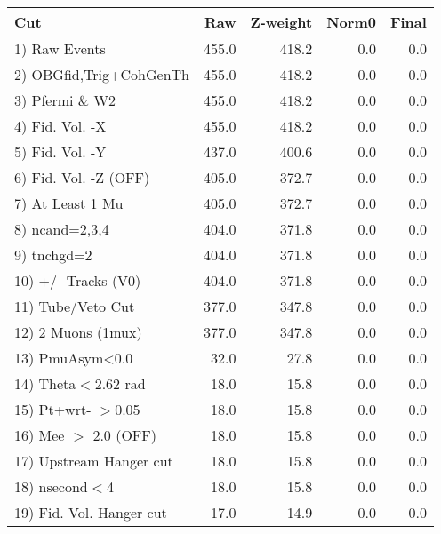  \begin{table}[h!]\centering
 \begin{tabular}{||l||r|r|r|r||}
 \hline
 \hline
 Cut & Raw & Z-weight & Norm0 & Final \\
 \hline
  1) Raw Events           &       455.0 &       418.2 &         0.0 &         0.0 \\
  2) OBGfid,Trig+CohGenTh &       455.0 &       418.2 &         0.0 &         0.0 \\
  3) Pfermi \& W2         &       455.0 &       418.2 &         0.0 &         0.0 \\
  4) Fid. Vol. -X         &       455.0 &       418.2 &         0.0 &         0.0 \\
  5) Fid. Vol. -Y         &       437.0 &       400.6 &         0.0 &         0.0 \\
  6) Fid. Vol. -Z (OFF)   &       405.0 &       372.7 &         0.0 &         0.0 \\
  7) At Least 1 Mu        &       405.0 &       372.7 &         0.0 &         0.0 \\
  8) ncand=2,3,4          &       404.0 &       371.8 &         0.0 &         0.0 \\
  9) tnchgd=2             &       404.0 &       371.8 &         0.0 &         0.0 \\
 10) +/- Tracks (V0)      &       404.0 &       371.8 &         0.0 &         0.0 \\
 11) Tube/Veto Cut        &       377.0 &       347.8 &         0.0 &         0.0 \\
 12) 2 Muons (1mux)       &       377.0 &       347.8 &         0.0 &         0.0 \\
 13) PmuAsym<0.0          &        32.0 &        27.8 &         0.0 &         0.0 \\
 14) Theta$<$2.62 rad     &        18.0 &        15.8 &         0.0 &         0.0 \\
 15) Pt+wrt- $>$0.05      &        18.0 &        15.8 &         0.0 &         0.0 \\
 16) Mee $>$ 2.0  (OFF)   &        18.0 &        15.8 &         0.0 &         0.0 \\
 17) Upstream Hanger cut  &        18.0 &        15.8 &         0.0 &         0.0 \\
 18) nsecond$<$4          &        18.0 &        15.8 &         0.0 &         0.0 \\
 19) Fid. Vol. Hanger cut &        17.0 &        14.9 &         0.0 &         0.0 \\

\end{tabular}
\end{table}
